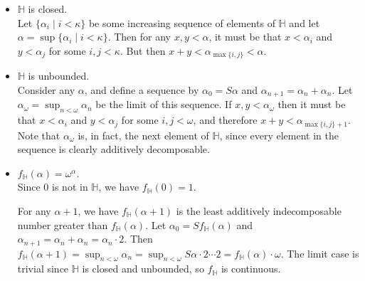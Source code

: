 \documentclass[12pt]{article}
\begin{document}

\begin{itemize} 

\item $\mathbb{H}$ is closed.\\

Let $\{\alpha_i\mid i<\kappa\}$ be some increasing sequence of elements of $\mathbb{H}$ and let $\alpha=\sup \{\alpha_i\mid i<\kappa\}$.  Then for any $x,y<\alpha$,  it must be that $x<\alpha_i$ and $y<\alpha_j$ for some $i,j<\kappa$.  But then $x+y<\alpha_{\max\{i,j\}}<\alpha$.

\item $\mathbb{H}$ is unbounded.\\

Consider any $\alpha$, and define a sequence by $\alpha_0=S\alpha$ and $\alpha_{n+1}=\alpha_n+\alpha_n$.  Let $\alpha_\omega=\sup_{n<\omega}\alpha_n$ be the limit of this sequence.  If $x,y<\alpha_\omega$ then it must be that $x<\alpha_i$ and $y<\alpha_j$ for some $i,j<\omega$, and therefore $x+y<\alpha_{\max\{i,j\}+1}$.  Note that $\alpha_\omega$ is, in fact, the next element of $\mathbb{H}$, since every element in the sequence is clearly additively decomposable.

\item $f_\mathbb{H}(\alpha)=\omega^\alpha$.\\

Since $0$ is not in $\mathbb{H}$, we have $f_\mathbb{H}(0)=1$.

For any $\alpha+1$, we have $f_\mathbb{H}(\alpha+1)$ is the least additively indecomposable number greater than $f_\mathbb{H}(\alpha)$.  Let $\alpha_0=Sf_\mathbb{H}(\alpha)$ and $\alpha_{n+1}=\alpha_n+\alpha_n=\alpha_n\cdot 2$.  Then $f_\mathbb{H}(\alpha+1)=\sup_{n<\omega} \alpha_n=\sup_{n<\omega}S\alpha\cdot 2\cdots 2=f_\mathbb{H}(\alpha)\cdot\omega$.  The limit case is trivial since $\mathbb{H}$ is closed and unbounded, so $f_\mathbb{H}$ is continuous.
\end{itemize}
\end{document}
